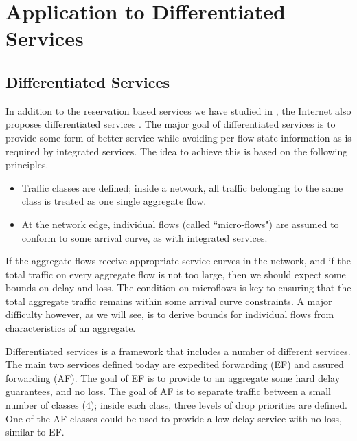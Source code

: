 \section{Application to Differentiated Services}
 
\subsection{Differentiated Services}

In addition to the reservation based services we have studied in
, the Internet also proposes differentiated
services \cite{RFC2475}. The major goal of differentiated services
is to provide some form of better service while avoiding per flow
state information as is required by integrated services. The idea
to achieve this is based on the following principles.
\begin{itemize}
  \item Traffic classes are defined; inside a network,
  all traffic belonging to
  the same class is treated as one single aggregate flow.
  \item At the network edge, individual flows (called ``micro-flows")
  are assumed to conform to some arrival curve, as with integrated
  services.
\end{itemize}
\begin{figure}[!htbp]
\end{figure}
If the aggregate flows receive appropriate service curves in the
network, and if the total traffic on every aggregate flow is not
too large, then we should expect some bounds on delay and loss.
The condition on microflows is key to ensuring that the total
aggregate traffic remains within some arrival curve constraints. A
major difficulty however, as we will see, is to derive bounds for
individual flows from characteristics of an aggregate.

Differentiated services is a framework that includes a number of
different services. The main two services defined today are
expedited forwarding
(EF)\cite{efnew-april,psrgton} and assured
forwarding (AF)\cite{RFC2597}.
The goal of EF is to provide to an aggregate some hard delay
guarantees, and no loss. The goal of AF is to separate traffic
between a small number of classes (4); inside each class, three
levels of drop priorities are defined. One of the AF classes could
be used to provide a low delay service with no loss, similar to
EF.

